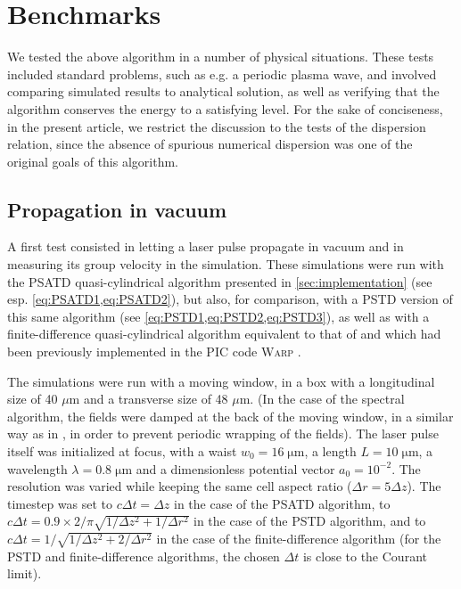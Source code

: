 \documentclass[1p,times]{elsarticle}
\begin{document}
\section{Benchmarks}
\label{sec:benchmarks}

We tested the above algorithm in a number of physical situations. These
tests included standard problems, such as e.g. a periodic plasma wave,
and involved comparing simulated results to analytical solution, as well
as verifying that the algorithm conserves the energy to a satisfying
level. For the sake of conciseness, in the present article, we
restrict the discussion to the tests of the dispersion
relation, since the absence of spurious numerical dispersion was one 
of the original goals of this algorithm.

\subsection{Propagation in vacuum}
\label{sec:vacuum_vg}

A first test consisted in letting a laser pulse propagate in vacuum and in
measuring its group velocity in the simulation. These simulations were
run with the PSATD quasi-cylindrical algorithm presented in
\cref{sec:implementation} (see
esp. \cref{eq:PSATD1,eq:PSATD2}), 
but also, for comparison, with a PSTD
version of this same algorithm (see \cref{eq:PSTD1,eq:PSTD2,eq:PSTD3}), 
as well as with a finite-difference quasi-cylindrical
algorithm equivalent to that of \cite{Lifschitz,Davidson} and which had
been previously implemented in the PIC code \textsc{Warp} \cite{Warpref}.

The simulations were run with a moving window, in a box with a
longitudinal size of 40 $\mu$m and a transverse size of 48 $\mu$m. (In
the case of the spectral algorithm, the fields were damped at the back
of the moving window, in a similar way as in \cite{YuIPAC2015}, in
order to prevent periodic wrapping of the fields).
The laser pulse itself was initialized at focus, with a waist 
$w_0 = 16 \;\mathrm{\mu m}$, a length $L = 10 \; \mathrm{\mu m}$,
a wavelength $\lambda = 0.8 \; \mathrm{\mu m}$ and a 
dimensionless potential vector $a_0 = 10^{-2}$.
The resolution was varied while keeping the same cell aspect ratio ($\Delta r = 5\Delta z$). The
timestep was set to $c\Delta t = \Delta z$ in the case of the PSATD
algorithm, to $c\Delta t = 0.9\times 2/\pi\sqrt{1/\Delta z^2 +
  1/\Delta r^2}$ in the case of the PSTD algorithm, and to $c\Delta t = 1/\sqrt{1/\Delta z^2 +
  2/\Delta r^2}$ in the case of the finite-difference algorithm (for
the PSTD and finite-difference algorithms, the chosen $\Delta t$ is
close to the Courant limit). 
\end{document}
